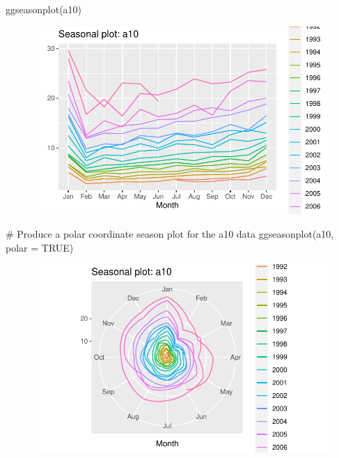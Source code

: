 \documentclass[
  letterpaper,
  DIV=11,
  numbers=noendperiod]{scrartcl}
\newenvironment{Shaded}{\begin{snugshade}}{\end{snugshade}}
\newcommand{\AttributeTok}[1]{\textcolor[rgb]{0.40,0.45,0.13}{#1}}
\newcommand{\CommentTok}[1]{\textcolor[rgb]{0.37,0.37,0.37}{#1}}
\newcommand{\ConstantTok}[1]{\textcolor[rgb]{0.56,0.35,0.01}{#1}}
\newcommand{\FunctionTok}[1]{\textcolor[rgb]{0.28,0.35,0.67}{#1}}
\newcommand{\NormalTok}[1]{\textcolor[rgb]{0.00,0.23,0.31}{#1}}
\begin{document}
\begin{Shaded}
\begin{Highlighting}[]
\FunctionTok{ggseasonplot}\NormalTok{(a10)}
\end{Highlighting}
\end{Shaded}

\begin{figure}[H]

{\centering \includegraphics{forecasting_datacamp_ex_files/figure-pdf/unnamed-chunk-3-2.pdf}

}

\end{figure}

\begin{Shaded}
\begin{Highlighting}[]
\CommentTok{\# Produce a polar coordinate season plot for the a10 data}
\FunctionTok{ggseasonplot}\NormalTok{(a10, }\AttributeTok{polar =} \ConstantTok{TRUE}\NormalTok{)}
\end{Highlighting}
\end{Shaded}

\begin{figure}[H]

{\centering \includegraphics{forecasting_datacamp_ex_files/figure-pdf/unnamed-chunk-3-3.pdf}

}

\end{figure}
\end{document}
